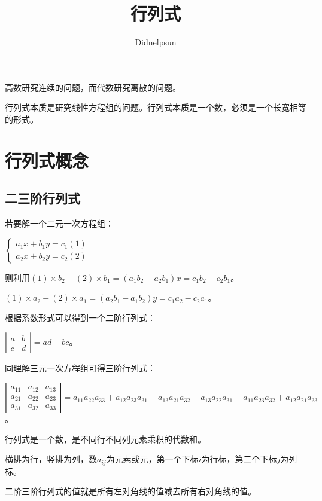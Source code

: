 \documentclass[UTF8, 12pt]{ctexart}
\author{Didnelpsun}
\title{行列式}
\date{}
\begin{document}
\maketitle
\pagestyle{empty}
\thispagestyle{empty}
\tableofcontents
\thispagestyle{empty}
\newpage
\pagestyle{plain}
\setcounter{page}{1}

高数研究连续的问题，而代数研究离散的问题。

行列式本质是研究线性方程组的问题。行列式本质是一个数，必须是一个长宽相等的形式。

\section{行列式概念}

\subsection{二三阶行列式}

若要解一个二元一次方程组：

$\begin{cases}
    a_1x+b_1y=c_1 (1) \\
    a_2x+b_2y=c_2 (2) 
\end{cases}
$

则利用$(1)\times b_2-(2)\times b_1=(a_1b_2-a_2b_1)x=c_1b_2-c_2b_1$。

$(1)\times a_2-(2)\times a_1=(a_2b_1-a_1b_2)y=c_1a_2-c_2a_1$。

根据系数形式可以得到一个二阶行列式：

$
\left|\begin{array}{cc} 
    a & b \\
    c & d
\end{array}\right| 
=ad-bc$。

同理解三元一次方程组可得三阶行列式：

$
\left|\begin{array}{ccc} 
    a_{11} & a_{12} & a_{13} \\
    a_{21} & a_{22} & a_{23} \\
    a_{31} & a_{32} & a_{33}
\end{array}\right| 
=a_{11}a_{22}a_{33}+a_{12}a_{23}a_{31}+a_{13}a_{21}a_{32}-a_{13}a_{22}a_{31}-a_{11}a_{23}a_{32}+a_{12}a_{21}a_{33}$。

行列式是一个数，是不同行不同列元素乘积的代数和。

横排为行，竖排为列，数$a_{ij}$为元素或元，第一个下标$i$为行标，第二个下标$j$为列标。

二阶三阶行列式的值就是所有左对角线的值减去所有右对角线的值。
\end{document}
